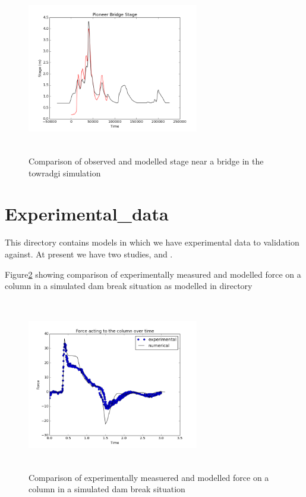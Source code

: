 \documentclass{manual}
\begin{document}
\begin{figure}[htp]
  \centerline{\includegraphics[width=75mm, height=75mm]
    {graphics/pioneer-bridge.png}}
  \caption{Comparison of observed  and modelled stage near a  bridge in the towradgi simulation}
  \label{fig:towradgi:pioneer}
\end{figure}


\section{Experimental\_data}

This directory contains models in which we have experimental data to validation against. At present we have two studies,  and .
 
Figure\ref{fig:yeh:petroff:force} showing comparison of experimentally measured and modelled force on a column  in a simulated dam break situation as modelled in directory 

\begin{figure}[htp]
  \centerline{\includegraphics[width=75mm, height=75mm]
    {graphics/force.png}}
  \caption{Comparison of experimentally measuered and modelled force on a column  in a simulated dam break situation}
  \label{fig:yeh:petroff:force}
\end{figure}
\end{document}
